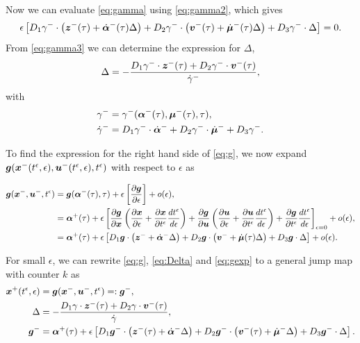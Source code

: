 \documentclass[../DC2017114Bouma.tex]{subfiles}
\begin{document}
Now we can evaluate \eqref{eq:gamma} using \eqref{eq:gamma2}, which gives
\begin{align}
\epsilon\left[ D_1 \gamma^{-}\cdot \left({\boldsymbol{z}}^{-}(\tau) + \dot{\boldsymbol{\alpha}}^{-}(\tau)\Delta\right) + D_2 \gamma^{-}\cdot  \left({\boldsymbol{v}}^{-}(\tau) + \dot{\boldsymbol{\mu}}^{-}(\tau) \Delta\right) + D_3 \gamma^{-}\cdot  \Delta \right] = 0. \label{eq:gamma3}
\end{align}
From \eqref{eq:gamma3} we can determine the expression for $\Delta$,
\begin{align}
\Delta = -\frac{D_1 \gamma^{-} \cdot {\boldsymbol{z}}^{-}(\tau) + D_2 \gamma^{-}\cdot {\boldsymbol{v}}^{-}(\tau)}{\dot{\gamma}^{-}}, \label{eq:Delta}
\end{align}
with
\begin{align}
\gamma^{-} &= \gamma^{-}(\boldsymbol{\alpha}^{-}(\tau),\boldsymbol{\mu}^{-}(\tau),\tau),\\
\dot{\gamma}^{-} &= D_1 \gamma^{-} \cdot \dot{\boldsymbol{\alpha}}^{-} + D_2 \gamma^{-}\cdot  \dot{\boldsymbol{\mu}}^{-} + D_3 \gamma^{-}.
\end{align}

To find the expression for the right hand side of \eqref{eq:g}, we now expand ${\boldsymbol{g}}({\boldsymbol{x}}^{-}(t^\epsilon,\epsilon),{\boldsymbol{u}}^{-}(t^\epsilon,\epsilon),t^\epsilon)$ with respect to $\epsilon$ as

\begin{align}
{\boldsymbol{g}}({\boldsymbol{x}}^{-},{\boldsymbol{u}}^{-},t^\epsilon) &= {\boldsymbol{g}}(\boldsymbol{\alpha}^-(\tau),\tau) + \epsilon\left[\frac{\partial{\boldsymbol{g}}}{\partial\epsilon}\right] + o(\epsilon),\\
&= \boldsymbol{\alpha}^+(\tau) + \epsilon\left[\frac{\partial{\boldsymbol{g}}}{\partial{\boldsymbol{x}}}\left(\frac{\partial{\boldsymbol{x}}}{\partial\epsilon} + \frac{\partial{\boldsymbol{x}}}{\partial t^\epsilon}\frac{dt^\epsilon}{d\epsilon} \right) + \frac{\partial{\boldsymbol{g}}}{\partial{\boldsymbol{u}}}\left(\frac{\partial{\boldsymbol{u}}}{\partial\epsilon} + \frac{\partial{\boldsymbol{u}}}{\partial t^\epsilon}\frac{d t^\epsilon}{d\epsilon}\right) + \frac{\partial{\boldsymbol{g}}}{\partial t^\epsilon}\frac{d t^\epsilon}{d\epsilon} \right]_{\epsilon = 0} + o(\epsilon),\\
&= \boldsymbol{\alpha}^+(\tau) + \epsilon\left[D_1{\boldsymbol{g}}\cdot \left({\boldsymbol{z}}^- + \dot{\boldsymbol{\alpha}}^-\Delta\right) + D_2{\boldsymbol{g}}\cdot \left({\boldsymbol{v}}^- + \dot{\boldsymbol{\mu}}(\tau) \Delta\right) + D_3{\boldsymbol{g}}\cdot \Delta\right] + o(\epsilon).\label{eq:gexp}
\end{align}

For small $\epsilon$, we can rewrite \eqref{eq:g}, \eqref{eq:Delta} and \eqref{eq:gexp} to a general jump map with counter $k$ as
\begin{align}
{\boldsymbol{x}}^{+}(t^\epsilon,\epsilon) &= {\boldsymbol{g}}({\boldsymbol{x}}^{-},{\boldsymbol{u}}^{-},t^\epsilon)=:{\boldsymbol{g}}^-,\label{eq:gmulti}\\
\Delta &= -\frac{D_1 \gamma\cdot {\boldsymbol{z}}^-(\tau) + D_2 \gamma\cdot {\boldsymbol{v}}^-(\tau)}{\dot{\gamma}}, \label{eq:Deltamulti}\\
{\boldsymbol{g}}^- &= \boldsymbol{\alpha}^+(\tau) + \epsilon\left[D_1{\boldsymbol{g}}^-\cdot \left({\boldsymbol{z}}^- (\tau) + \dot{\boldsymbol{\alpha}}^{-}\Delta \right) + D_2{\boldsymbol{g}}^-\cdot \left({\boldsymbol{v}}^- (\tau) + \dot{\boldsymbol{\mu}}^-\Delta \right) + D_3{\boldsymbol{g}}^-\cdot \Delta \right].\label{eq:gexpmulti}
\end{align}
\end{document}
